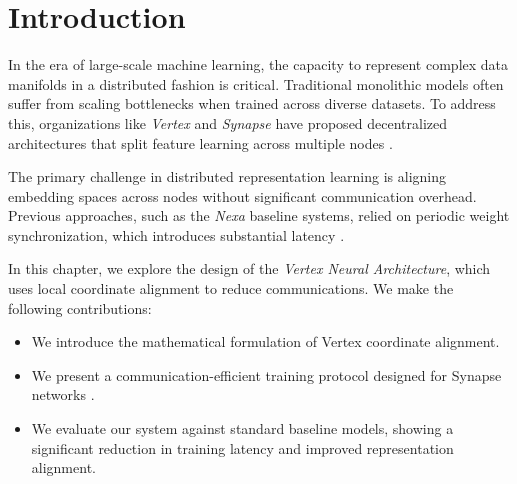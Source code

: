 \section{Introduction}
\label{sec:intro}

In the era of large-scale machine learning, the capacity to represent complex data manifolds in a distributed fashion is critical. Traditional monolithic models often suffer from scaling bottlenecks when trained across diverse datasets. To address this, organizations like \emph{Vertex} and \emph{Synapse} have proposed decentralized architectures that split feature learning across multiple nodes \cite{vance2024distributed}.

The primary challenge in distributed representation learning is aligning embedding spaces across nodes without significant communication overhead. Previous approaches, such as the \emph{Nexa} baseline systems, relied on periodic weight synchronization, which introduces substantial latency \cite{meridian2022spectral}. 

In this chapter, we explore the design of the \emph{Vertex Neural Architecture}, which uses local coordinate alignment to reduce communications. We make the following contributions:
\begin{itemize}
    \item We introduce the mathematical formulation of Vertex coordinate alignment.
    \item We present a communication-efficient training protocol designed for Synapse networks \cite{thorne2023synapse}.
    \item We evaluate our system against standard baseline models, showing a significant reduction in training latency and improved representation alignment.
\end{itemize}
